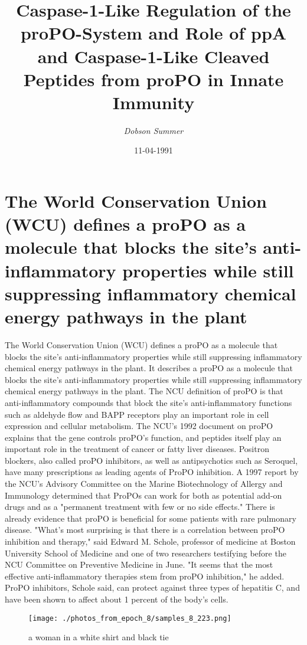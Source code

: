 \documentclass{article}%
\title{Caspase{-}1{-}Like Regulation of the proPO{-}System and Role of ppA and Caspase{-}1{-}Like Cleaved Peptides from proPO in Innate Immunity}%
\author{\textit{Dobson Summer}}%
\date{11-04-1991}%
\begin{document}
%
\normalsize%
\maketitle%
\section{The World Conservation Union (WCU) defines a proPO as a molecule that blocks the site's anti{-}inflammatory properties while still suppressing inflammatory chemical energy pathways in the plant}%
\label{sec:TheWorldConservationUnion(WCU)definesaproPOasamoleculethatblocksthesitesanti{-}inflammatorypropertieswhilestillsuppressinginflammatorychemicalenergypathwaysintheplant}%
The World Conservation Union (WCU) defines a proPO as a molecule that blocks the site's anti{-}inflammatory properties while still suppressing inflammatory chemical energy pathways in the plant. It describes a proPO as a molecule that blocks the site's anti{-}inflammatory properties while still suppressing inflammatory chemical energy pathways in the plant.\newline%
The NCU definition of proPO is that anti{-}inflammatory compounds that block the site's anti{-}inflammatory functions such as aldehyde flow and BAPP receptors play an important role in cell expression and cellular metabolism.\newline%
The NCU's 1992 document on proPO explains that the gene controls proPO's function, and peptides itself play an important role in the treatment of cancer or fatty liver diseases.\newline%
Positron blockers, also called proPO inhibitors, as well as antipsychotics such as Seroquel, have many prescriptions as leading agents of ProPO inhibition.\newline%
A 1997 report by the NCU's Advisory Committee on the Marine Biotechnology of Allergy and Immunology determined that ProPOs can work for both as potential add{-}on drugs and as a "permanent treatment with few or no side effects."\newline%
There is already evidence that proPO is beneficial for some patients with rare pulmonary disease.\newline%
"What's most surprising is that there is a correlation between proPO inhibition and therapy," said Edward M. Schole, professor of medicine at Boston University School of Medicine and one of two researchers testifying before the NCU Committee on Preventive Medicine in June. "It seems that the most effective anti{-}inflammatory therapies stem from proPO inhibition," he added.\newline%
ProPO inhibitors, Schole said, can protect against three types of hepatitis C, and have been shown to affect about 1 percent of the body's cells.\newline%

%


\begin{figure}[h!]%
\centering%
\texttt{[image: ./photos\_from\_epoch\_8/samples\_8\_223.png]}%
\caption{a woman in a white shirt and black tie}%
\end{figure}

%
\end{document}

